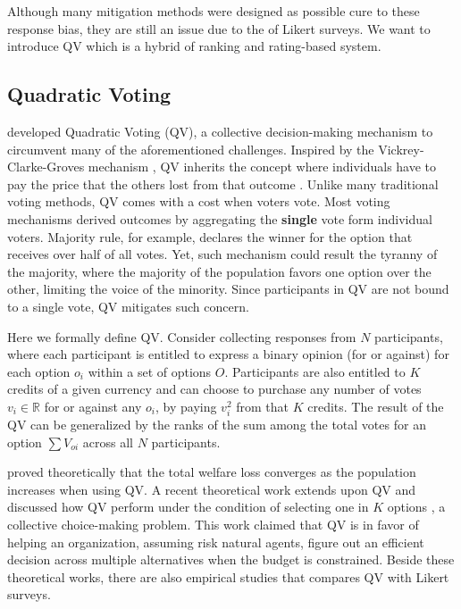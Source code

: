 Although many mitigation methods were designed as possible cure to these response bias, they are still an issue due to the  of Likert surveys. We want to introduce QV which is a hybrid of ranking and rating-based system.

\subsection{Quadratic Voting}
\textcite{posner2018radical} developed Quadratic Voting (QV), a collective decision-making mechanism \cite{lalley2018quadratic} to circumvent many of the aforementioned challenges. Inspired by the Vickrey-Clarke-Groves mechanism \cite{roughgarden2010algorithmic}, QV inherits the concept where individuals have to pay the price that the others lost from that outcome \cite{posner2018radical}. 
Unlike many traditional voting methods, QV comes with a cost when voters vote. Most voting mechanisms derived outcomes by aggregating the \textbf{single} vote form individual voters. Majority rule, for example, declares the winner for the option that receives over half of all votes. Yet, such mechanism could result the tyranny of the majority, where the majority of the population favors one option over the other, limiting the voice of the minority. Since participants in QV are not bound to a single vote, QV mitigates such concern.

Here we formally define QV. Consider collecting responses from $N$ participants, where each participant is entitled to express a binary opinion (for or against) for each option $o_i$ within a set of options $O$. Participants are also entitled to $K$ credits of a given currency and can choose to purchase any number of votes $v_i \in \mathbb{R}$ for or against any $o_i$, by paying $v_i^2$ from that $K$ credits. The result of the QV can be generalized by the ranks of the sum among the total votes for an option $\sum{V_{oi}}$ across all $N$ participants.\par

\textcite{lalley2018quadratic} proved theoretically that the total welfare loss converges as the population increases when using QV. A recent theoretical work extends upon QV and discussed how QV perform under the condition of selecting one in $K$ options \cite{eguia2019quadratic}, a collective choice-making problem. This work claimed that QV is in favor of helping an organization, assuming risk natural agents, figure out an efficient decision across multiple alternatives when the budget is constrained. Beside these theoretical works, there are also empirical studies that compares QV with Likert surveys.


